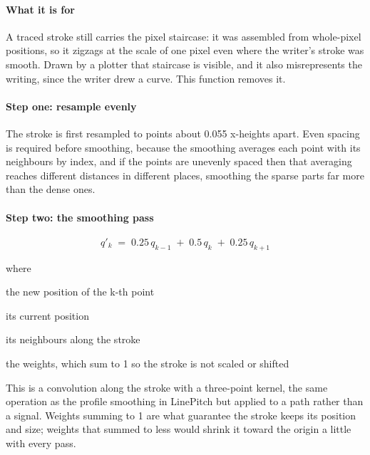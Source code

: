 \paragraph{What it is for}
A traced stroke still carries the pixel staircase: it was assembled from whole-pixel positions, so it zigzags at the scale of one pixel even where the writer's stroke was smooth. Drawn by a plotter that staircase is visible, and it also misrepresents the writing, since the writer drew a curve. This function removes it.


\paragraph{Step one: resample evenly}
The stroke is first resampled to points about 0.055 x-heights apart. Even spacing is required before smoothing, because the smoothing averages each point with its neighbours by index, and if the points are unevenly spaced then that averaging reaches different distances in different places, smoothing the sparse parts far more than the dense ones.


\paragraph{Step two: the smoothing pass}

\begin{equation}
q'_k \;=\; 0.25\,q_{k-1} \;+\; 0.5\,q_k \;+\; 0.25\,q_{k+1}
\end{equation}

\noindent where
\begin{description}[leftmargin=2.4em,style=nextline,font=\normalfont\ttfamily]\setlength\itemsep{1pt}
  \item[{$q'_k$}] \normalfont the new position of the k-th point
  \item[{$q_k$}] \normalfont its current position
  \item[{$q_{k-1},\, q_{k+1}$}] \normalfont its neighbours along the stroke
  \item[{$0.25,\,0.5,\,0.25$}] \normalfont the weights, which sum to 1 so the stroke is not scaled or shifted
\end{description}
This is a convolution along the stroke with a three-point kernel, the same operation as the profile smoothing in LinePitch but applied to a path rather than a signal. Weights summing to 1 are what guarantee the stroke keeps its position and size; weights that summed to less would shrink it toward the origin a little with every pass.

